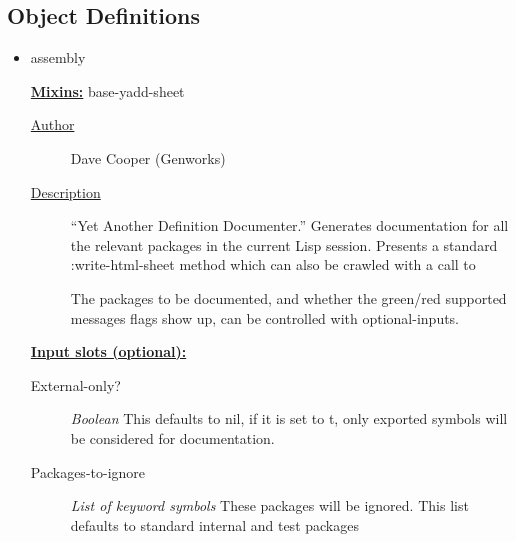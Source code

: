 \documentclass [11pt]{book}
\begin{document}
\subsection{Object Definitions}

\label{subsec:objectdefinitions}



\begin{itemize}

\item {}assembly


\textbf{
\underline{Mixins:}} base-yadd-sheet





\begin{description}

\item [
\underline{Author}]


Dave Cooper (Genworks)



\item [
\underline{Description}]


``Yet Another Definition Documenter.'' Generates 
documentation for all the relevant packages in the current Lisp session. Presents a 
standard :write-html-sheet method which can also be crawled with a call to 


The packages to be documented, and whether the green/red supported 
messages flags show up, can be controlled with optional-inputs.



\end{description}








\textbf{
\underline{Input slots (optional):}}

\begin{description}

\item [External-only?]
\emph{Boolean} This defaults to nil, if it is set to t, only exported symbols will be
considered for documentation.


\item [Packages-to-ignore]
\emph{List of keyword symbols} These packages will be ignored.
This list defaults to standard internal and test packages



\end{description}
\end{itemize}
\end{document}
